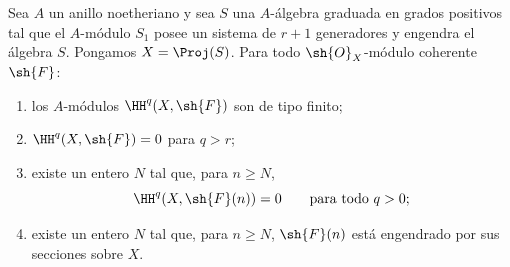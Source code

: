 \documentclass[oneside]{amsart}
\renewcommand{\geq}{\geqslant}
\let\EGAOriginalLabel\label
\renewcommand{\label}[1]{\phantomsection\EGAOriginalLabel{#1}}
\begin{document}
\begin{proposition}[2.2.2]
\label{III.2.2.2}
Sea $A$ un anillo noetheriano y sea $S$ una $A$-álgebra graduada en grados positivos tal que el $A$-módulo $S_1$ posee un sistema de $r+1$ generadores y engendra el álgebra $S$.
Pongamos $X=\Proj(S)$.
Para todo $\sh{O}_X$-módulo coherente $\sh{F}$:
\begin{enumerate}
  \item[{\rm(i)}] los $A$-módulos $\HH^q(X,\sh{F})$ son de tipo finito;
  \item[{\rm(ii)}] $\HH^q(X,\sh{F})=0$ para $q>r$;
  \item[{\rm(iii)}] existe un entero $N$ tal que, para $n\geq N$,
  \[
    \HH^q(X,\sh{F}(n))=0
    \qquad\text{para todo }q>0;
  \]
  \item[{\rm(iv)}] existe un entero $N$ tal que, para $n\geq N$, $\sh{F}(n)$ está engendrado por sus secciones sobre $X$.
\end{enumerate}
\end{proposition}
\end{document}
